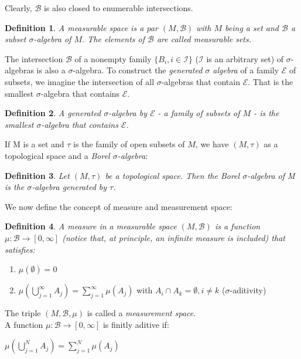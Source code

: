 \documentclass[a4paper,12pt] {article}
\newtheorem{definition}{Definition}[section]
\begin{document}
 Clearly, $\mathcal{B}$ is also closed to enumerable intersections.

\begin{definition}
    A measurable space is a par $(M,\mathcal{B})$ with $M$ being a set and $\mathcal{B}$ a subset $\sigma$-algebra of $M$. The elements of $\mathcal{B}$ are called \textit{measurable sets}.
\end{definition}

The intersection $\mathcal{B}$ of a nonempty family $\{B_i, i \in \mathcal{I}\}$ ($\mathcal{I}$ is an arbitrary set) of $\sigma$-algebras is also a $\sigma$-algebra. To construct the \textit{generated $\sigma$ algebra} of a family $\mathcal{E}$ of subsets, we imagine the intersection of all $\sigma$-algebras that contain $\mathcal{E}$. That is the smallest $\sigma$-algebra that contains $\mathcal{E}$.

\begin{definition}
A generated $\sigma$-algebra by $\mathcal{E}$ - a family of subsets of $M$ - is the smallest $\sigma$-algebra that contains $\mathcal{E}$.
\end{definition} 

 If M is a set and $\tau$ is the family of open subsets of $M$, we have $(M,\tau)$ as a topological space and a \textit{Borel $\sigma$-algebra}:

 \begin{definition}
 Let $(M,\tau)$ be a topological space. Then the Borel $\sigma$-algebra of M is the $\sigma$-algebra generated by $\tau$.
\end{definition}

 We now define the concept of measure and measurement space:

\begin{definition}
   A measure in a measurable space $(M,\mathcal{B})$ is a function $\mu : \mathcal{B} \to [0,\infty]$ (notice that, at principle, an infinite measure is included) that satisfies: 
\end{definition}

\begin{enumerate}
    \item $\mu(\emptyset) = 0$
    \item $\mu(\bigcup_{j=1}^\infty A_j) = \sum_{j=1}^\infty \mu(A_j)$ with $A_i \cap A_k = \emptyset, i \neq k$ ($\sigma$-aditivity)
\end{enumerate}

 The triple $(M,\mathcal{B},\mu)$ is called a \textit{measurement space}.\\
\indent A function $\mu : \mathcal{B} \to [0,\infty]$ is finitly aditive if:\\
\begin{center}
    $\mu(\displaystyle \bigcup_{j=1}^N A_j) = \displaystyle \sum_{j=1}^N \mu(A_j)$
\end{center}
\end{document}
